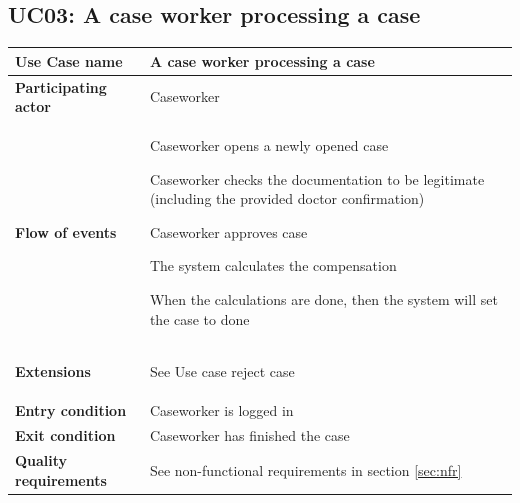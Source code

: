 \subsection{UC03: A case worker processing a case}
\begin{table}[htb!]
\begin{tabularx}{\textwidth}{l|X}
	\textbf{Use Case name} & A case worker processing a case \\
	\hline
	\textbf{Participating actor} & Caseworker\\
	\hline
	\textbf{Flow of events} &
	\vspace{-2mm}
	    \begin{compactenum}
	        \item Caseworker opens a newly opened case
	        \item Caseworker checks the documentation to be legitimate (including the provided doctor confirmation)
	        \item Caseworker approves case
	        \item The system calculates the compensation
	        \item When the calculations are done, then the system will set the case to done
	    \end{compactenum}\\
	\hline
	\textbf{Extensions} & 
	    \vspace{-2mm}
	    \begin{compactenum}
	        \setcounter{enumi}{2}
	        \item See Use case reject case
	    \end{compactenum}\\
	\hline
	\textbf{Entry condition} & Caseworker is logged in\\
	\hline
	\textbf{Exit condition} & Caseworker has finished the case\\
	\hline
	\textbf{Quality requirements} & See non-functional requirements in section \ref{sec:nfr}\\
\end{tabularx}
\end{table}